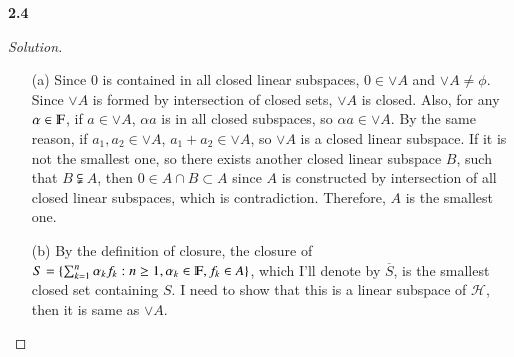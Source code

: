\documentclass[a4paper, 12pt]{article}
\theoremstyle{Mydefinition}
\theoremstyle{Mytheorem}
\begin{document}
\noindent \textbf{2.4}

\begin{proof}[Solution]%
\begin{enumerate}
    \item[(a)]Since $0$ is contained in all closed linear subspaces, $0\in\vee A$ and $\vee A\neq \phi$. Since $\vee A$ is formed by intersection of closed sets, $\vee A$ is closed. Also, for any $\alpha\in \varmathbb{F}$, if $a\in \vee A$, $\alpha a$ is in all closed subspaces, so $\alpha a\in \vee A$. By the same reason, if $a_1,a_2\in \vee A$, $a_1+a_2\in \vee A$, so $\vee A$ is a closed linear subspace. If it is not the smallest one, so there exists another closed linear subspace $B$, such that $B\subsetneqq A$, then $0\in A\cap B \subset A$ since $A$ is constructed by intersection of all closed linear subspaces, which is contradiction. Therefore, $A$ is the smallest one.
    \item[(b)]By the definition of closure, the closure of $S=\{\sum_{k=1}^n \alpha_k f_k:n\geq 1, \alpha_k\in \varmathbb{F}, f_k\in A\}$, which I'll denote by $\overline{S}$, is the smallest closed set containing $S$. I need to show that this is a linear subspace of $\mathscr{H}$, then it is same as $\vee A$.


\end{enumerate}
\end{proof}
\end{document}
